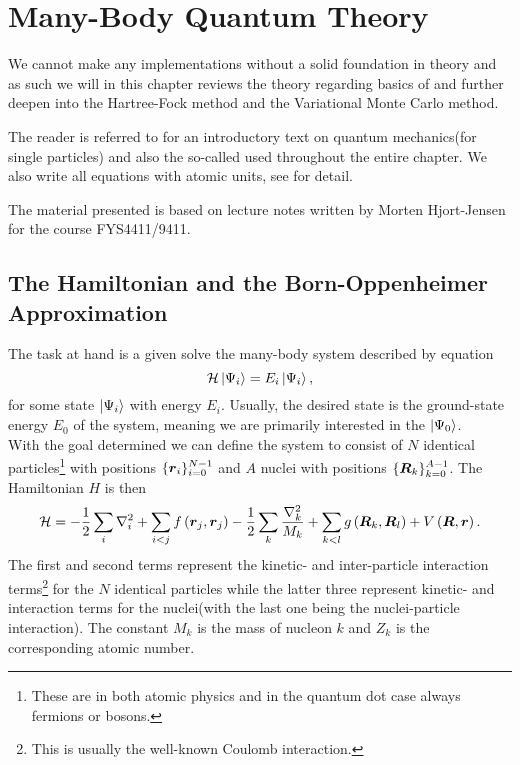 \chapter{Many-Body Quantum Theory\label{chapter:2}}
    We cannot make any implementations without a solid foundation in theory and
    as such we will in this chapter reviews the theory regarding basics of
     and further deepen into the Hartree-Fock
    method and the Variational Monte Carlo method. 

    The reader is referred to \cite{GriffQuan} for an introductory text on
    quantum mechanics(for single particles) and also the so-called
     used throughout the entire chapter. We also write
    all equations with atomic units, see  for detail.

    The material presented is based on lecture notes \cite{basicMB, vmc} written
    by Morten Hjort-Jensen for the course FYS4411/9411.

\section{The Hamiltonian and the Born-Oppenheimer Approximation\label{sec:3.1}}
    The task at hand is a given solve the many-body system described by
     equation
        \begin{equation}
            \mathcal{H}\ket{\Psi_i} = E_i\ket{\Psi_i},
            \label{eq:SE}
        \end{equation}
    for some state $\ket{\Psi_i}$ with energy $E_i$. Usually, the desired state
    is the ground-state energy $E_0$ of the system, meaning we are primarily
    interested in the  $\ket{\Psi_0}$. \\ With the goal
    determined we can define the system to consist of $N$ identical
    particles\footnote{These are in both atomic physics and in the quantum dot
    case always fermions or bosons.} with positions
    $\{\boldsymbol{{r}}_i\}^{N-1}_{i=0}$ and $A$ nuclei with positions
    $\{\boldsymbol{{R}}_k\}^{A-1}_{k=0}$. The Hamiltonian $H$ is then
        \begin{equation}
            \mathcal{H} = - \frac{1}{2} \sum\limits_i \nabla^2_i + \sum_{i<j}
            f\left(\boldsymbol{{r}}_j, \boldsymbol{{r}}_j\right) - \frac{1}{2} \sum_k
            \frac{\nabla^2_k}{M_k} + \sum_{k<l}
            g\left(\boldsymbol{{R}}_k,\boldsymbol{{R}}_l\right) +
            V\left(\boldsymbol{{R}},\boldsymbol{{r}}\right).
        \end{equation}
    The first and second terms represent the kinetic- and inter-particle
    interaction terms\footnote{This is usually the well-known Coulomb
    interaction.} for the $N$ identical particles while the latter three
    represent kinetic- and interaction terms for the nuclei(with the last one
    being the nuclei-particle interaction). The constant $M_k$ is the mass of
    nucleon $k$ and $Z_k$ is the corresponding atomic number.


